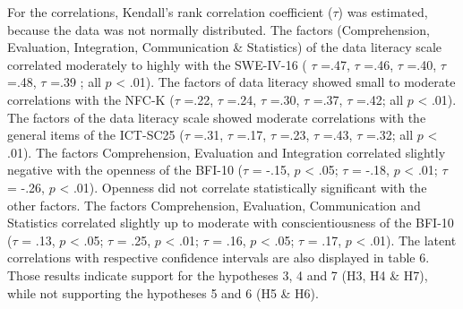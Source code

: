 \documentclass[
  12pt,
  a4paper,
  twoside]{article}
\begin{document}
For the correlations, Kendall's rank correlation coefficient (\(\tau\)) was estimated, because the data was not normally distributed. The factors (Comprehension, Evaluation, Integration, Communication \& Statistics) of the data literacy scale correlated moderately to highly with the SWE-IV-16 ( \(\tau\) =.47, \(\tau\) =.46, \(\tau\) =.40, \(\tau\) =.48, \(\tau\) =.39 ; all \(p\) \textless{} .01). The factors of data literacy showed small to moderate correlations with the NFC-K (\(\tau\) =.22, \(\tau\) =.24, \(\tau\) =.30, \(\tau\) =.37, \(\tau\) =.42; all \(p\) \textless{} .01). The factors of the data literacy scale showed moderate correlations with the general items of the ICT-SC25 (\(\tau\) =.31, \(\tau\) =.17, \(\tau\) =.23, \(\tau\) =.43, \(\tau\) =.32; all \(p\) \textless{} .01). The factors Comprehension, Evaluation and Integration correlated slightly negative with the openness of the BFI-10 (\(\tau\) = -.15, \(p\) \textless{} .05; \(\tau\) = -.18, \(p\) \textless{} .01; \(\tau\) = -.26, \(p\) \textless{} .01). Openness did not correlate statistically significant with the other factors. The factors Comprehension, Evaluation, Communication and Statistics correlated slightly up to moderate with conscientiousness of the BFI-10 (\(\tau\) = .13, \(p\) \textless{} .05; \(\tau\) = .25, \(p\) \textless{} .01; \(\tau\) = .16, \(p\) \textless{} .05; \(\tau\) = .17, \(p\) \textless{} .01). The latent correlations with respective confidence intervals are also displayed in table 6.
Those results indicate support for the hypotheses 3, 4 and 7 (H3, H4 \& H7), while not supporting the hypotheses 5 and 6 (H5 \& H6).
\end{document}
